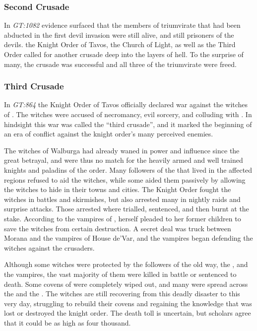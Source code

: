 \subsubsection{Second Crusade}
\label{sec:Second Crusade}

In \emph{GT:1082} evidence surfaced that the members of triumvirate that had
been abducted in the first devil invasion were still alive, and still
prisoners of the devils. the Knight Order of Tavos, the Church of Light, as
well as the Third Order called for another crusade deep into the layers of
hell. To the surprise of many, the crusade was successful and all three of
the triumvirate were freed.

\subsubsection{Third Crusade}
\label{sec:Third Crusade}

In \emph{GT:864} the Knight Order of Tavos officially declared war against the
witches of . The witches were accused of necromancy,
evil sorcery, and colluding with . In hindsight this war
was called the ``third crusade'', and it marked the beginning of an era of
conflict against the knight order's many perceived enemies.

The witches of Walburga had already waned in power and influence since the
great betrayal, and were thus no match for the heavily armed and well trained
knights and paladins of the order. Many followers of the 
that lived in the affected regions refused to aid the witches, while some
aided them passively by allowing the witches to hide in their towns and
cities. The Knight Order fought the witches in battles and skirmishes, but also
arrested many in nightly raids and surprise attacks. Those arrested where
trialled, sentenced, and then burnt at the stake. According to the vampires of
,  herself pleaded to her former
children to save the witches from certain destruction. A secret deal was truck
between Morana and the vampires of House de'Var, and the vampires began
defending the witches against the crusaders.

Although some witches were protected by the followers of the old way, the
, and the vampires, the vast majority of them were
killed in battle or sentenced to death. Some covens of 
were completely wiped out, and many were spread across the
 and the . The witches
are still recovering from this deadly disaster to this very day, struggling to
rebuild their covens and regaining the knowledge that was lost or destroyed
the knight order. The death toll is uncertain, but scholars agree that it
could be as high as four thousand.

